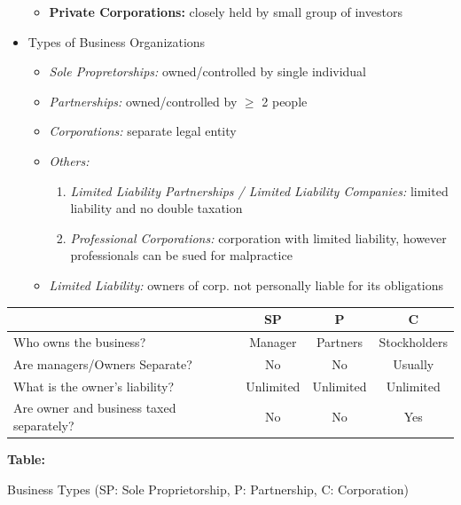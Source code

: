 \documentclass[10pt,landscape]{article}
\begin{document}
\begin{multicols*}{3}
\begin{itemize}[topsep=0pt,noitemsep,wide=0pt, leftmargin=\dimexpr{} + 2\relax]
\begin{itemize}[topsep=0pt,noitemsep,wide=0pt, leftmargin=\dimexpr{} + 2\relax]
        \item \textbf{Private Corporations:} closely held by small group of investors
    \end{itemize}
    \item Types of Business Organizations
    \begin{itemize}[topsep=0pt,noitemsep,wide=0pt, leftmargin=\dimexpr{} + 2\relax]
        \item \textit{Sole Propretorships:} owned/controlled by single individual
        \item \textit{Partnerships:} owned/controlled by $\geq$ 2 people
        \item \textit{Corporations:} separate legal entity
        \item \textit{Others:}
        \begin{enumerate}[topsep=0pt,noitemsep,wide=0pt, leftmargin=\dimexpr\labelwidth + 2\labelsep\relax]
            \item \textit{Limited Liability Partnerships / Limited Liability Companies:} limited liability and no double taxation
            \item \textit{Professional Corporations:} corporation with limited liability, however professionals can be sued for malpractice
        \end{enumerate}
        \item \textit{Limited Liability:} owners of corp. not personally liable for its obligations
    \end{itemize}
\end{itemize}
\setlength{\tabcolsep}{2pt}
\noindent
\begin{tabular}{|p{4.5cm}|c|c|c|}
\hline
& \textbf{SP} & \textbf{P} & \textbf{C} \\
\hline
Who owns the business? & Manager & Partners & Stockholders \\
\hline
Are managers/Owners Separate? & No & No & Usually \\
\hline
What is the owner's liability? & Unlimited & Unlimited & Unlimited \\
\hline
Are owner and business taxed separately? & No & No & Yes \\
\hline
\end{tabular}

\vspace{0.5em}
\textbf{\tiny{Table:}} \begin{tiny}Business Types (SP: Sole Proprietorship, P: Partnership, C: Corporation)\end{tiny}


\end{multicols*}
\end{document}
